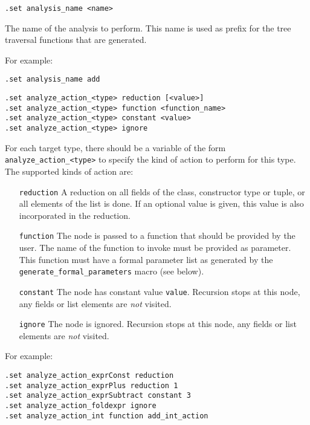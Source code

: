 \begin{verbatim}
.set analysis_name <name>
\end{verbatim}
\begin{desc}
The name of the analysis to perform. This name is used as prefix for
the tree traversal functions that are generated.
\par
For example:
\begin{verbatim}
.set analysis_name add
\end{verbatim}
\end{desc}

\begin{verbatim}
.set analyze_action_<type> reduction [<value>]
.set analyze_action_<type> function <function_name>
.set analyze_action_<type> constant <value>
.set analyze_action_<type> ignore
\end{verbatim}
\begin{desc}
\begin{sloppypar}
For each target type, there should be a variable of the form
\verb'analyze_action_<type>' to specify the kind of action to perform
for this type.  The supported kinds of action are:
\end{sloppypar}
\begin{itemize}
\item[{\tt reduction}] A reduction on all fields of the class, constructor
type or tuple, or all elements of the list is done. If an optional
value is given, this value is also incorporated in the reduction.
\item[{\tt function}] The node is passed to a function that should be
provided by the user. The name of the function to invoke must be provided
as parameter. This function must have a formal parameter list
as generated by the \verb'generate_formal_parameters' macro (see below).
\item[{\tt constant}] The node has constant value {\tt value}. Recursion
stops at this node, any fields or list elements are {\em not} visited.
\item[{\tt ignore}] The node is ignored. Recursion stops at this node,
any fields or list elements are {\em not} visited.
\end{itemize}

\par
For example:
\begin{verbatim}
.set analyze_action_exprConst reduction
.set analyze_action_exprPlus reduction 1
.set analyze_action_exprSubtract constant 3
.set analyze_action_foldexpr ignore
.set analyze_action_int function add_int_action
\end{verbatim}
\end{desc}


